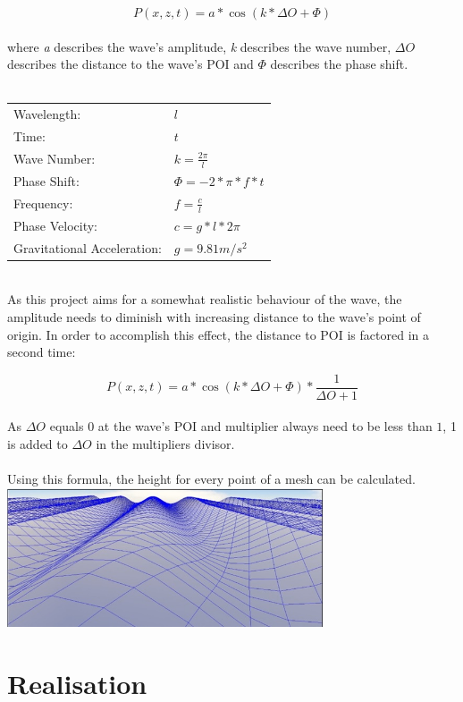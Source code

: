 \documentclass[12pt,a4paper]{scrartcl}
\begin{document}
$$P(x,z,t) = a * \cos(k * {\Delta}O + \Phi) $$
\ \\
where \textit{a} describes the wave's amplitude, \textit{k} describes the wave number, ${\Delta}O$ describes the distance to the wave's POI and $\Phi$ describes the phase shift.\\
\ \\
\begin{center}
	\begin{tabular}{ll}
		Wavelength: & $l$ \\
		Time: & $t$ \\
		Wave Number: & $k = \frac{2\pi}{l}$ \\
		Phase Shift: & $\Phi = -2 * \pi * f * t$ \\
		Frequency: & $f = \frac{c}{l}$ \\
		Phase Velocity: & $c = g * l * 2\pi$ \\
		Gravitational Acceleration: & $g = 9.81 m/s^2$
	\end{tabular}
\end{center}
\ \\
As this project aims for a somewhat realistic behaviour of the wave, the amplitude needs to diminish with increasing distance to the wave's point of origin. In order to accomplish this effect, the distance to POI is factored in a second time:

$$P(x,z,t) = a * \cos(k * {\Delta}O + \Phi) * \frac{1}{{\Delta}O+1} $$
\ \\
As ${\Delta}O$ equals $0$ at the wave's POI and multiplier always need to be less than $1$, 1 is added to ${\Delta}O$ in the multipliers divisor.\\
\ \\
Using this formula, the height for every point of a mesh can be calculated.\\


\includegraphics[width=0.7\textwidth]{Images/SinWaves.jpg}


\section{Realisation}
\end{document}
